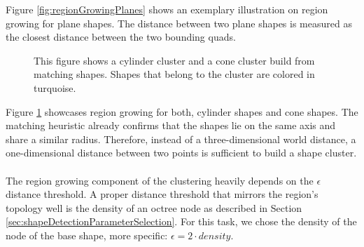 Figure \ref{fig:regionGrowingPlanes} shows an exemplary illustration on region growing for plane shapes. The distance between two plane shapes is measured as the closest distance between the two bounding quads. 

\begin{figure}
\centering
{}
    \caption[Exemplary cylinder and clone cluster]
		{This figure shows a cylinder cluster and a cone cluster build from matching shapes. Shapes that belong to the cluster are colored in turquoise.}
    \label{fig:regionGrowingConeCylinder}
\end{figure}

Figure \ref{fig:regionGrowingConeCylinder} showcases region growing for both, cylinder shapes and cone shapes. The matching heuristic already confirms that the shapes lie on the same axis and share a similar radius. Therefore, instead of a three-dimensional world distance, a one-dimensional distance between two points is sufficient to build a shape cluster. 
\\
\\
The region growing component of the clustering heavily depends on the $\epsilon$ distance threshold. A proper distance threshold that mirrors the region's topology well is the density of an octree node as described in Section \ref{sec:shapeDetectionParameterSelection}. For this task, we chose the density of the node of the base shape, more specific: $\epsilon = 2 \cdot density $.